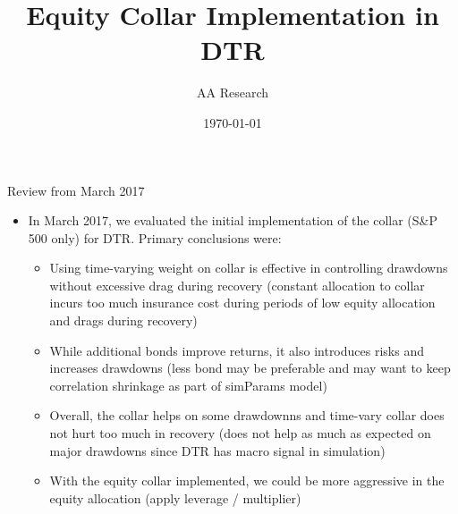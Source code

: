 \documentclass{beamer}
\title[Equity Collar Implementation in DTR]{Equity Collar Implementation in DTR}
\author[ AA Research ]{ AA Research }
\date{\today}
\begin{document}
\begin{frame}
  \titlepage
\end{frame}

\begin{frame}{Review from March 2017}
\begin{itemize}

\item In March 2017, we evaluated the initial implementation of the collar (S\&P 500 only) for DTR. Primary conclusions were:
	\vfill
	\begin{itemize}
	\item Using time-varying weight on collar is effective in controlling drawdowns without excessive drag during recovery (constant allocation to collar incurs too much insurance cost during periods of low equity allocation and drags during recovery)
	\vfill
	\item While additional bonds improve returns, it also introduces risks and increases drawdowns (less bond may be preferable and may want to keep correlation shrinkage as part of simParams model)
	\vfill
	\vfill
	\item Overall, the collar helps on some drawdownns and time-vary collar does not hurt too much in recovery (does not help as much as expected on major drawdowns since DTR has macro signal in simulation)
	\vfill
	\item With the equity collar implemented, we could be more aggressive in the equity allocation (apply leverage / multiplier)
	\vfill	
	\end{itemize}
\end{itemize}
\end{frame}

\end{document}
